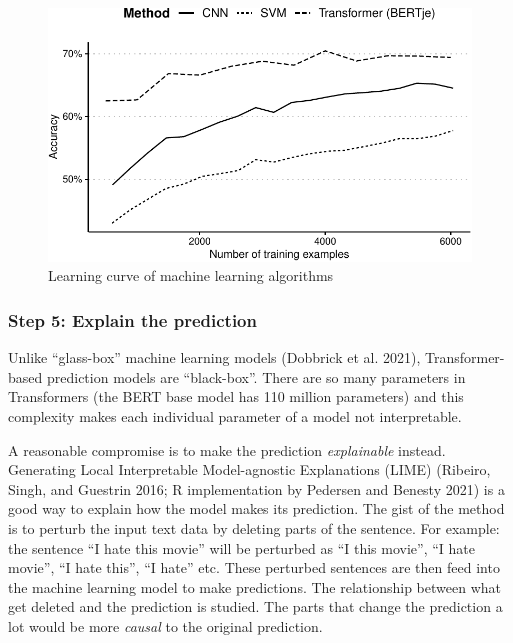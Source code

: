 \documentclass[
]{ccr}
\begin{document}
\begin{figure}

{\centering \includegraphics{img/fig-fig1-1.pdf}

}

\caption{\label{fig-fig1}Learning curve of machine learning algorithms}

\end{figure}

\hypertarget{step-5-explain-the-prediction}{%
\subsubsection{Step 5: Explain the
prediction}\label{step-5-explain-the-prediction}}

Unlike ``glass-box'' machine learning models (Dobbrick et al. 2021),
Transformer-based prediction models are ``black-box''. There are so many
parameters in Transformers (the BERT base model has 110 million
parameters) and this complexity makes each individual parameter of a
model not interpretable.

A reasonable compromise is to make the prediction \emph{explainable}
instead. Generating Local Interpretable Model-agnostic Explanations
(LIME) (Ribeiro, Singh, and Guestrin 2016; R implementation by Pedersen
and Benesty 2021) is a good way to explain how the model makes its
prediction. The gist of the method is to perturb the input text data by
deleting parts of the sentence. For example: the sentence ``I hate this
movie'' will be perturbed as ``I this movie'', ``I hate movie'', ``I
hate this'', ``I hate'' etc. These perturbed sentences are then feed
into the machine learning model to make predictions. The relationship
between what get deleted and the prediction is studied. The parts that
change the prediction a lot would be more \emph{causal} to the original
prediction.
\end{document}
